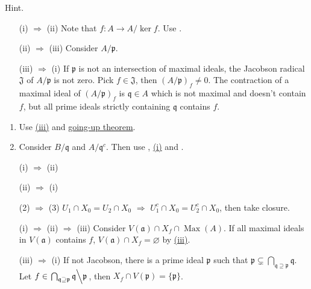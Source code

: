 \begin{exercise}\label{ex5.22}
	Hint.
\end{exercise}

\begin{exercise}\label{ex5.23}
	\begin{enumerate}
		\item[(i) $\Rightarrow$ (ii)] Note that $f:A\rightarrow A/\ker f$. Use .
		\item[(ii) $\Rightarrow$ (iii)] Consider $A/\mathfrak{p}$.
		\item[(iii) $\Rightarrow$ (i)] If $\mathfrak{p}$ is not an intersection of maximal ideals, the Jacobson radical $\mathfrak{J}$ of $A/\mathfrak{p}$ is not zero. Pick $f\in\mathfrak{J}$, then $(A/\mathfrak{p})_f\neq0$. The contraction of a maximal ideal of $(A/\mathfrak{p})_f$ is $\mathfrak{q}\in A$ which is not maximal and doesn't contain $f$, but all prime ideals strictly containing $\mathfrak{q}$ contains $f$.
	\end{enumerate}
\end{exercise}

\begin{exercise}\label{ex5.24}
	\begin{enumerate}[label=(\roman*),ref=\theexercise(\roman*)]
		\item Use \hyperref[ex5.23]{(iii)} and \hyperref[5.11]{going-up theorem}.
		\item Consider $B/\mathfrak{q}$ and $A/\mathfrak{q}^c$. Then use , \hyperref[ex5.23]{(i)} and .
	\end{enumerate}
\end{exercise}

\begin{exercise}\label{ex5.25}
	\begin{enumerate}
		\item[(i) $\Rightarrow$ (ii)] 
		\item[(ii) $\Rightarrow$ (i)] 
	\end{enumerate}
\end{exercise}

\begin{exercise}\label{ex5.26}
	\begin{enumerate}
		\item[(2) $\Rightarrow$ (3)] $U_1\cap X_0=U_2\cap X_0$ $\Rightarrow$ $U_1^c\cap X_0=U_2^c\cap X_0$, then take closure.
		\item[(i) $\Rightarrow$ (ii) $\Rightarrow$ (iii)] Consider $V(\mathfrak{a})\cap X_f\cap\operatorname{Max}(A)$. If all maximal ideals in $V(\mathfrak{a})$ contains $f$, $V(\mathfrak{a})\cap X_f=\varnothing$ by \hyperref[ex5.23]{(iii)}.
		\item[(iii) $\Rightarrow$ (i)] If not Jacobson, there is a prime ideal $\mathfrak{p}$ such that $\mathfrak{p}\subsetneq\bigcap_{\mathfrak{q}\supseteq\mathfrak{p}}\mathfrak{q}$. Let $f\in\left.\bigcap_{\mathfrak{q}\supseteq\mathfrak{p}}\mathfrak{q}\middle\backslash\mathfrak{p}\right.$, then $X_f\cap V(\mathfrak{p})=\{\mathfrak{p}\}$.
	\end{enumerate}
\end{exercise}


